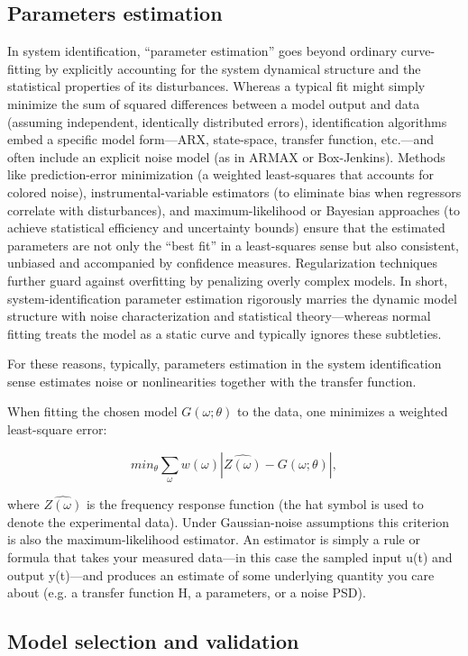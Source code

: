 \subsection{Parameters estimation}
In system identification, “parameter estimation” goes beyond ordinary curve-fitting by explicitly accounting for the system dynamical structure and the statistical properties of its disturbances. Whereas a typical fit might simply minimize the sum of squared differences between a model output and data (assuming independent, identically distributed errors), identification algorithms embed a specific model form—ARX, state-space, transfer function, etc.—and often include an explicit noise model (as in ARMAX or Box-Jenkins). Methods like prediction-error minimization (a weighted least-squares that accounts for colored noise), instrumental-variable estimators (to eliminate bias when regressors correlate with disturbances), and maximum-likelihood or Bayesian approaches (to achieve statistical efficiency and uncertainty bounds) ensure that the estimated parameters are not only the “best fit” in a least-squares sense but also consistent, unbiased and accompanied by confidence measures. Regularization techniques further guard against overfitting by penalizing overly complex models. In short, system-identification parameter estimation rigorously marries the dynamic model structure with noise characterization and statistical theory—whereas normal fitting treats the model as a static curve and typically ignores these subtleties.

For these reasons, typically, parameters estimation in the system identification sense estimates noise or nonlinearities together with the transfer function.

When fitting the chosen model $G(\omega; \theta)$ to the data, one minimizes a weighted least-square error:

$$
min_{\theta} \sum_{\omega} w(\omega) | \hat{Z(\omega)}-G(\omega;\theta)|,
$$

where $\hat{Z(\omega)}$ is the frequency response function (the hat symbol is used to denote the experimental data). Under Gaussian-noise assumptions this criterion is also the maximum-likelihood estimator. An estimator is simply a rule or formula that takes your measured data—in this case the sampled input u(t) and output y(t)—and produces an estimate of some underlying quantity you care about (e.g. a transfer function H, a parameters, or a noise PSD).

\subsection{Model selection and validation}

